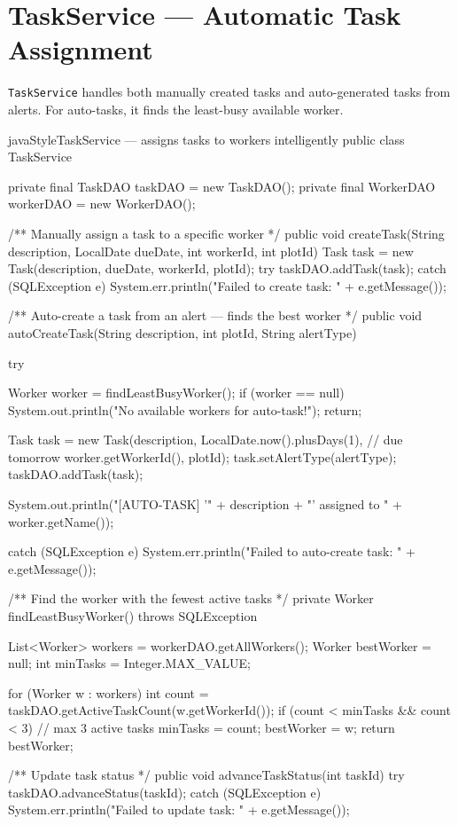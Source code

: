 \documentclass[12pt, a4paper]{report}
\begin{document}
\section{TaskService --- Automatic Task Assignment}

\texttt{TaskService} handles both manually created tasks and auto-generated tasks from alerts. For auto-tasks, it finds the least-busy available worker.

\begin{codeblock}{javaStyle}{TaskService --- assigns tasks to workers intelligently}
public class TaskService {
    private final TaskDAO   taskDAO   = new TaskDAO();
    private final WorkerDAO workerDAO = new WorkerDAO();

    /** Manually assign a task to a specific worker */
    public void createTask(String description, LocalDate dueDate,
                           int workerId, int plotId) {
        Task task = new Task(description, dueDate, workerId, plotId);
        try {
            taskDAO.addTask(task);
        } catch (SQLException e) {
            System.err.println("Failed to create task: "
                + e.getMessage());
        }
    }

    /** Auto-create a task from an alert — finds the best worker */
    public void autoCreateTask(String description, int plotId,
                               String alertType) {
        try {
            Worker worker = findLeastBusyWorker();
            if (worker == null) {
                System.out.println("No available workers for auto-task!");
                return;
            }

            Task task = new Task(description,
                LocalDate.now().plusDays(1), // due tomorrow
                worker.getWorkerId(), plotId);
            task.setAlertType(alertType);
            taskDAO.addTask(task);

            System.out.println("[AUTO-TASK] '" + description
                + "' assigned to " + worker.getName());
        } catch (SQLException e) {
            System.err.println("Failed to auto-create task: "
                + e.getMessage());
        }
    }

    /** Find the worker with the fewest active tasks */
    private Worker findLeastBusyWorker() throws SQLException {
        List<Worker> workers = workerDAO.getAllWorkers();
        Worker bestWorker = null;
        int minTasks = Integer.MAX_VALUE;

        for (Worker w : workers) {
            int count = taskDAO.getActiveTaskCount(w.getWorkerId());
            if (count < minTasks && count < 3) { // max 3 active tasks
                minTasks = count;
                bestWorker = w;
            }
        }
        return bestWorker;
    }

    /** Update task status */
    public void advanceTaskStatus(int taskId) {
        try {
            taskDAO.advanceStatus(taskId);
        } catch (SQLException e) {
            System.err.println("Failed to update task: "
                + e.getMessage());
        }
    }
}
\end{codeblock}
\end{document}
